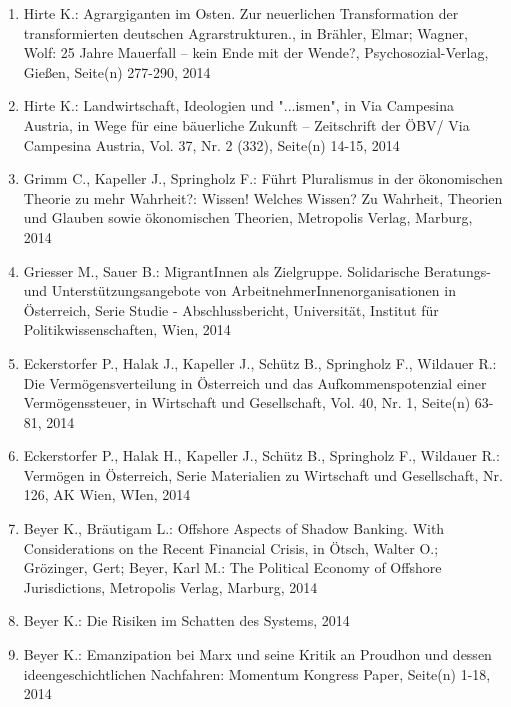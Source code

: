 \begin{enumerate}
	 \item Hirte K.: Agrargiganten im Osten. Zur neuerlichen Transformation der transformierten deutschen Agrarstrukturen., in Brähler, Elmar; Wagner, Wolf: 25 Jahre Mauerfall – kein Ende mit der Wende?, Psychosozial-Verlag, Gießen, Seite(n) 277-­290, 2014
	 \item Hirte K.: Landwirtschaft, Ideologien und "...ismen", in Via Campesina Austria, in Wege für eine bäuerliche Zukunft – Zeitschrift der ÖBV/ Via Campesina Austria, Vol. 37, Nr. 2 (332), Seite(n) 14-15, 2014
	 \item Grimm C., Kapeller J., Springholz F.: Führt Pluralismus in der ökonomischen Theorie zu mehr Wahrheit?: Wissen! Welches Wissen? Zu Wahrheit, Theorien und Glauben sowie ökonomischen Theorien, Metropolis Verlag, Marburg, 2014
	 \item Griesser M., Sauer B.: MigrantInnen als Zielgruppe. Solidarische Beratungs- und Unterstützungsangebote von ArbeitnehmerInnenorganisationen in Österreich, Serie Studie - Abschlussbericht, Universität, Institut für Politikwissenschaften, Wien, 2014
	 \item Eckerstorfer P., Halak J., Kapeller J., Schütz B., Springholz F., Wildauer R.: Die Vermögensverteilung in Österreich und das Aufkommenspotenzial einer Vermögenssteuer, in Wirtschaft und Gesellschaft, Vol. 40, Nr. 1, Seite(n) 63-81, 2014
	 \item Eckerstorfer P., Halak H., Kapeller J., Schütz B., Springholz F., Wildauer R.: Vermögen in Österreich, Serie Materialien zu Wirtschaft und Gesellschaft, Nr. 126, AK Wien, WIen, 2014
	 \item Beyer K., Bräutigam L.: Offshore Aspects of Shadow Banking. With Considerations on the Recent Financial Crisis, in Ötsch, Walter O.; Grözinger, Gert; Beyer, Karl M.: The Political Economy of Offshore Jurisdictions, Metropolis Verlag, Marburg, 2014
	 \item Beyer K.: Die Risiken im Schatten des Systems, 2014
	 \item Beyer K.: Emanzipation bei Marx und seine Kritik an Proudhon und dessen ideengeschichtlichen Nachfahren: Momentum Kongress Paper, Seite(n) 1-18, 2014
\end{enumerate}
